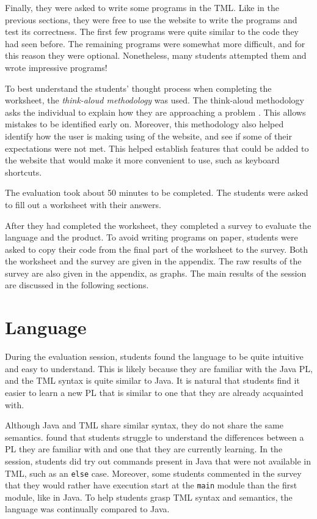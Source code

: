 Finally, they were asked to write some programs in the TML. Like in the previous sections, they were free to use the website to write the programs and test its correctness. The first few programs were quite similar to the code they had seen before. The remaining programs were somewhat more difficult, and for this reason they were optional. Nonetheless, many students attempted them and wrote impressive programs!

To best understand the students' thought process when completing the worksheet, the \emph{think-aloud methodology} was used. The think-aloud methodology asks the individual to explain how they are approaching a problem \citep{jorgensen1990thinking}. This allows mistakes to be identified early on. Moreover, this methodology also helped identify how the user is making using of the website, and see if some of their expectations were not met. This helped establish features that could be added to the website that would make it more convenient to use, such as keyboard shortcuts.

The evaluation took about 50 minutes to be completed. The students were asked to fill out a worksheet with their answers. 

After they had completed the worksheet, they completed a survey to evaluate the language and the product. To avoid writing programs on paper, students were asked to copy their code from the final part of the worksheet to the survey. Both the worksheet and the survey are given in the appendix. The raw results of the survey are also given in the appendix, as graphs. The main results of the session are discussed in the following sections.

\section{Language} 
During the evaluation session, students found the language to be quite intuitive and easy to understand. This is likely because they are familiar with the Java PL, and the TML syntax is quite similar to Java. It is natural that students find it easier to learn a new PL that is similar to one that they are already acquainted with. 

Although Java and TML share similar syntax, they do not share the same semantics. \citet{tshukudu2021teachers} found that students struggle to understand the differences between a PL they are familiar with and one that they are currently learning. In the session, students did try out commands present in Java that were not available in TML, such as an \texttt{else} case. Moreover, some students commented in the survey that they would rather have execution start at the \texttt{main} module than the first module, like in Java. To help students grasp TML syntax and semantics, the language was continually compared to Java.

